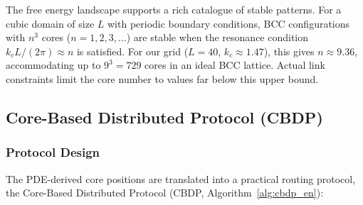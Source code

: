 \documentclass[sn-nature,pdflatex]{sn-jnl}
\begin{document}
The free energy landscape supports a rich catalogue of stable patterns.
For a cubic domain of size $L$ with periodic boundary conditions, BCC configurations with $n^3$ cores ($n = 1, 2, 3, \ldots$) are stable when the resonance condition $k_c L/(2\pi) \approx n$ is satisfied.
For our grid ($L = 40$, $k_c \approx 1.47$), this gives $n \approx 9.36$, accommodating up to $9^3 = 729$ cores in an ideal BCC lattice. Actual link constraints limit the core number to values far below this upper bound.

\subsection{Core-Based Distributed Protocol (CBDP)}
\label{sec:algorithm}

\subsubsection{Protocol Design}

The PDE-derived core positions are translated into a practical routing protocol, the Core-Based Distributed Protocol (CBDP, Algorithm~\ref{alg:cbdp_en}):
\end{document}
